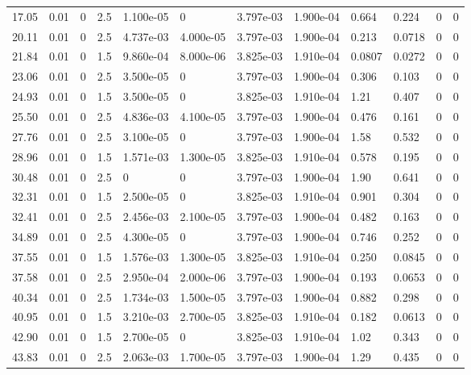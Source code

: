 \documentclass[preview]{standalone}
\begin{document}
{{\begin{tabular}{L{1.2cm}C{1.2cm} C{0.3cm}C{0.5cm} C{1.4cm}C{1.4cm} C{1.4cm}C{1.4cm} C{1.6cm}C{1.6cm} C{1.6cm}C{1.6cm}}
  17.05  &  0.01  & 0     & 2.5 &  1.100e-05  & 0  &  3.797e-03&   1.900e-04& 0.664 & 0.224   &  0 & 0  \\ 
  20.11  &  0.01  & 0     & 2.5 &  4.737e-03  & 4.000e-05  &  3.797e-03&   1.900e-04& 0.213 & 0.0718   &  0 & 0  \\ 
  21.84  &  0.01  & 0     & 1.5 &  9.860e-04  & 8.000e-06  &  3.825e-03&   1.910e-04& 0.0807 & 0.0272   &  0 & 0  \\ 
  23.06  &  0.01  & 0     & 2.5 &  3.500e-05  & 0  &  3.797e-03&   1.900e-04& 0.306 & 0.103   &  0 & 0  \\ 
  24.93  &  0.01  & 0     & 1.5 &  3.500e-05  & 0  &  3.825e-03&   1.910e-04& 1.21 & 0.407   &  0 & 0  \\ 
  25.50  &  0.01  & 0     & 2.5 &  4.836e-03  & 4.100e-05  &  3.797e-03&   1.900e-04& 0.476 & 0.161   &  0 & 0  \\ 
  27.76  &  0.01  & 0     & 2.5 &  3.100e-05  & 0  &  3.797e-03&   1.900e-04& 1.58 & 0.532   &  0 & 0  \\ 
  28.96  &  0.01  & 0     & 1.5 &  1.571e-03  & 1.300e-05  &  3.825e-03&   1.910e-04& 0.578 & 0.195   &  0 & 0  \\ 
  30.48  &  0.01  & 0     & 2.5 &  0  & 0  &  3.797e-03&   1.900e-04& 1.90 & 0.641   &  0 & 0  \\ 
  32.31  &  0.01  & 0     & 1.5 &  2.500e-05  & 0  &  3.825e-03&   1.910e-04& 0.901 & 0.304   &  0 & 0  \\ 
  32.41  &  0.01  & 0     & 2.5 &  2.456e-03  & 2.100e-05  &  3.797e-03&   1.900e-04& 0.482 & 0.163   &  0 & 0  \\ 
  34.89  &  0.01  & 0     & 2.5 &  4.300e-05  & 0  &  3.797e-03&   1.900e-04& 0.746 & 0.252   &  0 & 0  \\ 
  37.55  &  0.01  & 0     & 1.5 &  1.576e-03  & 1.300e-05  &  3.825e-03&   1.910e-04& 0.250 & 0.0845   &  0 & 0  \\ 
  37.58  &  0.01  & 0     & 2.5 &  2.950e-04  & 2.000e-06  &  3.797e-03&   1.900e-04& 0.193 & 0.0653   &  0 & 0  \\ 
  40.34  &  0.01  & 0     & 2.5 &  1.734e-03  & 1.500e-05  &  3.797e-03&   1.900e-04& 0.882 & 0.298   &  0 & 0  \\ 
  40.95  &  0.01  & 0     & 1.5 &  3.210e-03  & 2.700e-05  &  3.825e-03&   1.910e-04& 0.182 & 0.0613   &  0 & 0  \\ 
  42.90  &  0.01  & 0     & 1.5 &  2.700e-05  & 0  &  3.825e-03&   1.910e-04& 1.02 & 0.343   &  0 & 0  \\ 
  43.83  &  0.01  & 0     & 2.5 &  2.063e-03  & 1.700e-05  &  3.797e-03&   1.900e-04& 1.29 & 0.435   &  0 & 0  \\ 

\end{tabular}}}
\end{document}
